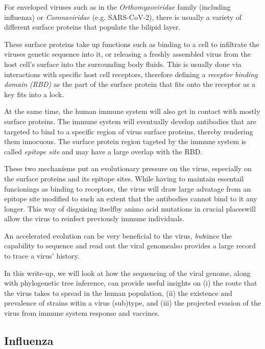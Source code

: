 \documentclass[12pt]{article}
\begin{document}
    For enveloped viruses such as in the \textit{Orthomyxoviridae} family (including influenza) or \textit{Coronaviridae} (e.g. SARS-CoV-2), there is usually a variety of different surface proteins that populate the bilipid layer.

    These surface proteins take up functions such as binding to a cell to infiltrate the viruses genetic sequence into it, or releasing a freshly assembled virus from the host cell's surface into the surrounding body fluids. This is usually done via interactions with specific host cell receptors, therefore defining a \textit{receptor binding domain (RBD)} as the part of the surface protein that fits onto the receptor as a key fits into a lock.

    At the same time, the human immune system will also get in contact with mostly surface proteins. The immune system will eventually develop antibodies that are targeted to bind to a specific region of virus surface proteins, thereby rendering them innocuous. The surface protein region tageted by the immune system is called \textit{epitope site} and may have a large overlap with the RBD.

    These two mechanisms put an evolutionary pressure on the virus, especially on the surface proteins and its epitope sites. While having to maintain essentail funcionings as binding to receptors, the virus will draw large advatage from an epitope site modified to such an extent that the antibodies cannot bind to it any longer. This way of disguising itself\textemdash by animo acid mutations in crucial places\textemdash will allow the virus to reinfect previously immune individuals.

    An accelerated evolution can be very beneficial to the virus, \textit{but}\textemdash since the capability to sequence and read out the viral genome\textemdash also provides a large record to trace a virus' history.

    In this write-up, we will look at how the sequencing of the viral genome, along with phylogenetic tree inference, can provide useful insights on (i) the route that the virus takes to spread in the human population, (ii) the existence and prevalence of strains witin a virus (sub)type, and (iii) the projected evasion of the virus from immune system response and vaccines.

  \subsection{Influenza}
\end{document}
